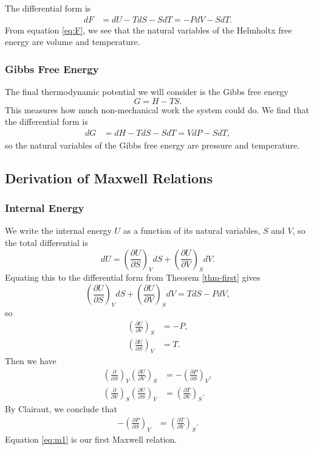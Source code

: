 The differential form is 
\begin{align}
dF &= dU - TdS - SdT
= -PdV-SdT. \label{eq:F}
\end{align}
From equation \ref{eq:F}, we see that the natural variables of the Helmholtx free energy are volume and temperature.
\subsubsection{Gibbs Free Energy}
The final thermodynamic potential we will consider is the Gibbs free energy $$G = H-TS.$$ This measures how much non-mechanical work the system could do. We find that the differential form is 
\begin{align}
dG &= dH - TdS - S dT
= VdP - S dT \label{eq:G},
\end{align} 
so the natural variables of the Gibbs free energy are pressure and temperature.
\subsection{Derivation of Maxwell Relations}
\subsubsection{Internal Energy}
We write the internal energy $U$ as a function of its natural variables, $S$ and $V$, so the total differential is
$$dU = \left(\frac{\partial U}{\partial S} \right)_V dS + \left(\frac{\partial U}{\partial V} \right)_S dV.$$ Equating this to the differential form from Theorem \ref{thm-first} gives $$\left(\frac{\partial U}{\partial S} \right)_V dS + \left(\frac{\partial U}{\partial V} \right)_S dV = TdS - PdV,$$ so
\begin{align*}
\left(\frac{\partial U}{\partial V} \right)_S &= -P,\\
\left(\frac{\partial U}{\partial S} \right)_V &= T.
\end{align*}
Then we have
\begin{align*}
\left(\frac{\partial }{\partial S} \right)_V\left(\frac{\partial U}{\partial V} \right)_S &= -\left(\frac{\partial P }{\partial S} \right)_V,\\
\left(\frac{\partial }{\partial V} \right)_S\left(\frac{\partial U}{\partial S} \right)_V &= \left(\frac{\partial T}{\partial V} \right)_S.
\end{align*}
By Clairaut, we conclude that 
\begin{align}
 -\left(\frac{\partial P }{\partial S} \right)_V &= \left(\frac{\partial T}{\partial V} \right)_S \label{eq:m1}.
\end{align}
Equation \ref{eq:m1} is our first Maxwell relation.
